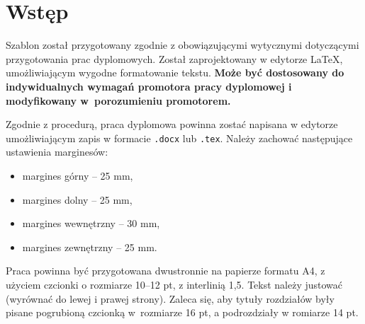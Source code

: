 \documentclass[12pt,a4paper,twoside]{report}
\theoremstyle{definition} %
\begin{document}
	\renewcommand{\contentsname}{\LARGE Spis treści}
    \tableofcontents
    \setcounter{tocdepth}{1}
    \cleardoublepage %

	
	\chapter*{Wstęp} 

Szablon został przygotowany zgodnie z obowiązującymi wytycznymi dotyczącymi przygotowania prac dyplomowych. Został zaprojektowany w edytorze \LaTeX{}, umożliwiającym wygodne formatowanie tekstu.  
\textbf{Może być dostosowany do indywidualnych wymagań promotora pracy dyplomowej i modyfikowany w~porozumieniu promotorem.}

Zgodnie z procedurą, praca dyplomowa powinna zostać napisana w edytorze umożliwiającym zapis w formacie \texttt{.docx} lub \texttt{.tex}. Należy zachować następujące ustawienia marginesów:
\begin{itemize}
    \item margines górny – 25 mm,
    \item margines dolny – 25 mm,
    \item margines wewnętrzny – 30 mm,
    \item margines zewnętrzny – 25 mm.
\end{itemize}

Praca powinna być przygotowana dwustronnie na papierze formatu A4, z użyciem czcionki o rozmiarze 10–12 pt, z interlinią 1,5. Tekst należy justować (wyrównać do lewej i prawej strony). Zaleca się, aby tytuły rozdziałów były pisane pogrubioną czcionką w~rozmiarze 16 pt, a podrozdziały w romiarze 14 pt.
\end{document}
